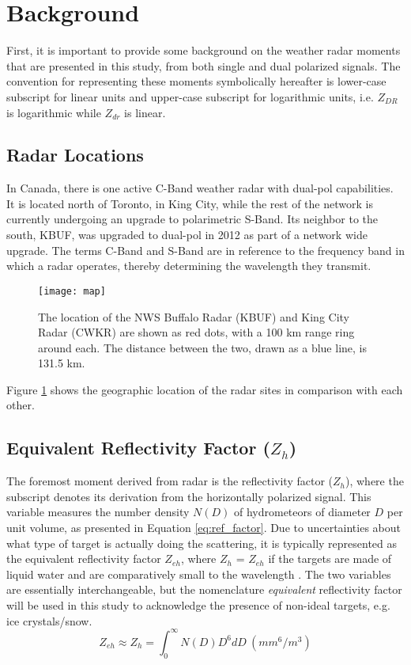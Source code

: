 \section{Background}
First, it is important to provide some background on the weather radar moments that are presented in this study, from both single and dual polarized signals.
The convention for representing these moments symbolically hereafter is lower-case subscript for linear units and upper-case subscript for logarithmic units,
i.e. $Z_{DR}$ is logarithmic while $Z_{dr}$ is linear.
\subsection{Radar Locations}
In Canada, there is one active C-Band weather radar with dual-pol capabilities. It is located north of Toronto, in King City, while the rest of the network
is
currently undergoing an upgrade to polarimetric S-Band. Its neighbor to the south, KBUF, was upgraded to dual-pol in 2012 as part of a network wide upgrade.
The terms C-Band and S-Band are in reference to the frequency band in which a radar operates, thereby determining the wavelength they transmit. 
\begin{figure}[h]
\texttt{[image: map]}
\caption{The location of the NWS Buffalo Radar (KBUF) and King City Radar (CWKR) are shown as red dots, with a 100 km range ring around each. The distance
between the two, drawn as a blue line, is 131.5 km.} 
\label{map}
\end{figure}
Figure \ref{map} shows the geographic location of the radar sites in comparison with each other.
\subsection{Equivalent Reflectivity Factor ($Z_{h}$)}
The foremost moment derived from radar is the reflectivity factor ($Z_{h}$), where the
subscript denotes its derivation from the horizontally polarized signal. This variable
measures the number density $N(D)$ of hydrometeors of diameter $D$ per unit volume, as
presented in Equation \ref{eq:ref_factor}. Due to uncertainties about what type of
target is actually doing the scattering, it is typically represented as the equivalent
reflectivity factor $Z_{eh}$, where $Z_{h}$ = $Z_{eh}$ if the targets are made of liquid 
water and are comparatively small to the wavelength \citep{Fabry2015}. The two variables are 
essentially interchangeable, but the nomenclature \textit{equivalent} reflectivity factor will be used in this
study to acknowledge the presence of non-ideal targets, e.g. ice crystals/snow.
\begin{equation}\label{eq:ref_factor}
Z_{eh} \approx Z_{h} = \int_0^{\infty} N(D)D^6dD \ (mm^6/m^3)
\end{equation}
